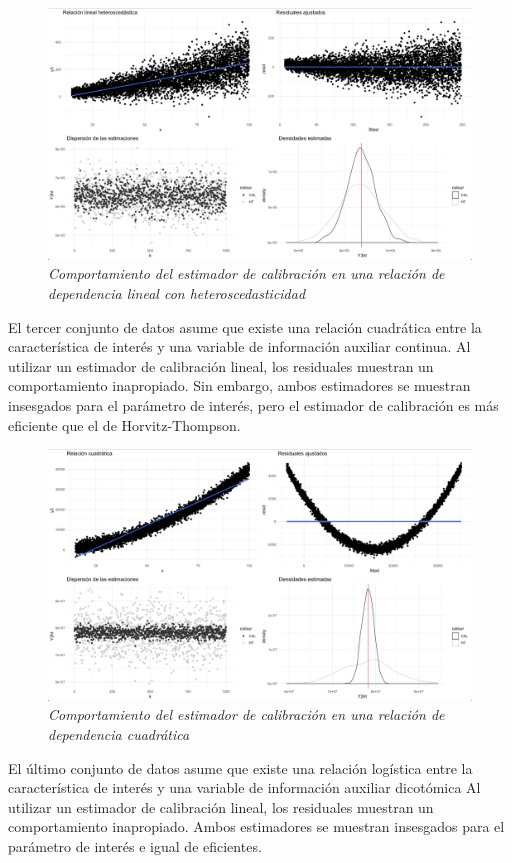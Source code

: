 \documentclass[
  12pt,
]{book}
\begin{document}
\begin{figure}
\centering
\includegraphics{Pics/c6.png}
\caption{\emph{Comportamiento del estimador de calibración en una relación de dependencia lineal con heteroscedasticidad}}
\end{figure}

El tercer conjunto de datos asume que existe una relación cuadrática entre la característica de interés y una variable de información auxiliar continua. Al utilizar un estimador de calibración lineal, los residuales muestran un comportamiento inapropiado. Sin embargo, ambos estimadores se muestran insesgados para el parámetro de interés, pero el estimador de calibración es más eficiente que el de Horvitz-Thompson.

\begin{figure}
\centering
\includegraphics{Pics/c7.png}
\caption{\emph{Comportamiento del estimador de calibración en una relación de dependencia cuadrática}}
\end{figure}

El último conjunto de datos asume que existe una relación logística entre la característica de interés y una variable de información auxiliar dicotómica Al utilizar un estimador de calibración lineal, los residuales muestran un comportamiento inapropiado. Ambos estimadores se muestran insesgados para el parámetro de interés e igual de eficientes.
\end{document}
